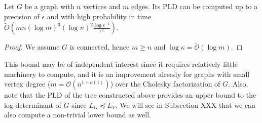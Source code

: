\begin{theorem} \label{thm:PLD-tree}Let $G$ be a graph with $n$
vertices and $m$ edges. Its PLD can be computed up to a precision
of $\epsilon$ and with high probability in time $\tilde{O}\left(mn\left(\log m\right)^{3}\left(\log n\right)^{2}\frac{\log\epsilon^{-1}}{\epsilon^{2}}\right)$.\end{theorem}

\begin{proof} We assume $G$ is connected, hence $m\geq n$ and $\log\kappa=\tilde{\mathcal{O}}\left(\log m\right)$.
\end{proof}

This bound may be of independent interest since it requires relatively
little machinery to compute, and it is an improvement already for
graphs with small vertex degree ($m=\mathcal{O}\left(n^{1+o\left(1\right)}\right)$)
over the Cholesky factorization of $G$. Also, note that the PLD of
the tree constructed above provides an upper bound to the log-determinant
of $G$ since $L_{G}\preceq L_{T}$. We will see in Subsection XXX
that we can also compute a non-trivial lower bound as well.
